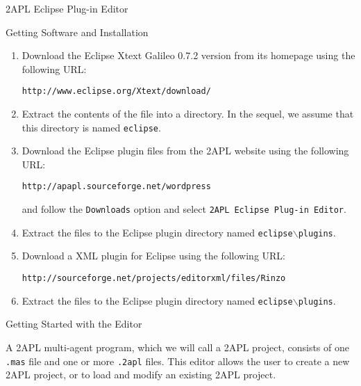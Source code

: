 \begin{section}{2APL Eclipse Plug-in Editor}
\begin{section}{Getting Software and Installation}
\begin{enumerate}
    \item Download the Eclipse Xtext Galileo 0.7.2 version from its homepage using the following URL:
    \begin{center}
        {\tt http://www.eclipse.org/Xtext/download/}
    \end{center}

    \item Extract the contents of the file into a directory. In the sequel, we assume that this directory is named {\tt eclipse}.

    \item Download the Eclipse plug\-in files from the 2APL website using the following URL:
    \begin{center}
    {\tt http://apapl.sourceforge.net/wordpress}
    \end{center}
    and follow the {\tt Downloads} option and select {\tt 2APL Eclipse Plug-in Editor}.

    \item Extract the files to the Eclipse plug\-in directory named {\tt eclipse$\backslash$plugins}.

    \item Download a XML plug\-in for Eclipse using the following URL:
    \begin{center}
    {\tt http://sourceforge.net/projects/editorxml/files/Rinzo}
    \end{center}

    \item Extract the files to the Eclipse plug\-in directory named
    {\tt eclipse$\backslash$plugins}.
\end{enumerate}
\end{section}


\begin{section}{Getting Started with the Editor}

A 2APL multi-agent program, which we will call a 2APL project,
consists of one \texttt{.mas} file and one or more \texttt{.2apl}
files. This editor allows the user to create a new 2APL project, or
to load and modify an existing 2APL project.


\end{section}
\end{section}
